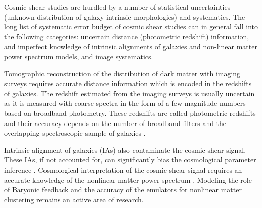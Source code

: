 


Cosmic shear studies are hurdled by a number of statistical uncertainties (unknown distribution 
of galaxy intrinsic morphologies) and systematics. The long list of systematic error budget 
of cosmic shear studies can in general fall into the following categories: uncertain distance 
(photometric redshift) information, and imperfect knowledge of intrinsic alignments of galaxies and non-linear matter 
power spectrum models, and image systematics. 

Tomographic reconstruction of the distribution of dark matter with imaging surveys requires 
accurate distance information which is encoded in the redshifts of galaxies. 
The redshift estimated from the imaging surveys is usually uncertain as it is measured with coarse 
spectra in the form of a few magnitude numbers based on broadband photometry. These redshifts are called 
photometric redshifts and their accuracy depends on the number of broadband filters and the overlapping spectroscopic 
sample of galaxies \citep{bonnett2016,choi2016,boris2016,hildebrandt2017}. %

Intrinsic alignment of galaxies (IAs) also contaminate the cosmic shear signal. These IAs, if not accounted for, 
can significantly bias the cosmological parameter inference \citep{codis2015,joachimi2015, kirk2015,krause_ia}. 
Cosmological interpretation of the cosmic shear signal requires an accurate knowledge of the nonlinear 
matter power spectrum \citep{semboloni2013, eifler2015, schaye2015, joudaki2016, kitching2016, mead2016}. Modeling the role of 
Baryonic feedback and the accuracy of the emulators for nonlinear matter clustering remains an active area of research. 

